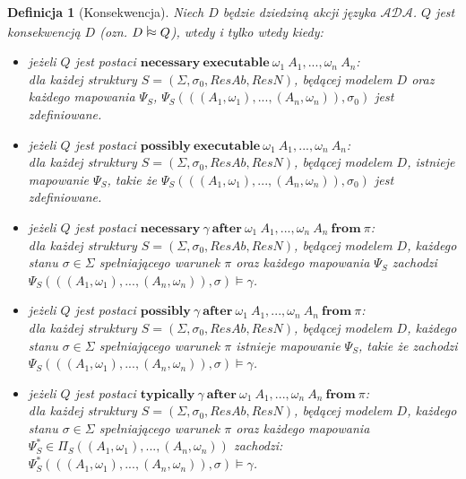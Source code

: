 \documentclass[11pt,a4paper]{article}
\newtheorem{definition}{Definicja}[section]
\newcommand{\vapprox}{\mathrel{\scalebox{1}[2]{$\shortmid$}\mkern-3.1mu\raisebox{0.1ex}{$\approx$}}}
\begin{document}
    \begin{definition}[Konsekwencja]
    	Niech $D$ będzie dziedziną akcji języka $\mathcal{ADA}$. $Q$ jest konsekwencją $D$ (ozn. $D \vapprox Q$), wtedy i tylko wtedy kiedy:
    
    \begin{itemize}
    	\item jeżeli $Q$ jest postaci $\mathbf{necessary}~\mathbf{executable}~\omega_1~A_1, ..., \omega_n~A_n$: \\ dla każdej struktury $S=(\Sigma, \sigma_0, ResAb, ResN)$, będącej modelem $D$ oraz każdego mapowania $\Psi_S$, $\Psi_S(((A_1, \omega_1), ..., (A_n, \omega_n)), \sigma_0)$ jest zdefiniowane.
    	
    	\item jeżeli $Q$ jest postaci $\mathbf{possibly}~\mathbf{executable}~\omega_1~A_1, ..., \omega_n~A_n$: \\ dla każdej struktury $S=(\Sigma, \sigma_0, ResAb, ResN)$, będącej modelem $D$, istnieje mapowanie $\Psi_S$, takie że $\Psi_S(((A_1, \omega_1), ..., (A_n, \omega_n)), \sigma_0)$ jest zdefiniowane.
    	
    	\item jeżeli $Q$ jest postaci $\mathbf{necessary}~\gamma~\mathbf{after}~\omega_1~A_1, ..., \omega_n~A_n~\mathbf{from}~\pi$: \\
    	dla każdej struktury $S=(\Sigma, \sigma_0, ResAb, ResN)$, będącej modelem $D$, każdego stanu $\sigma \in \Sigma$ spełniającego warunek $\pi$ oraz każdego mapowania $\Psi_S$ zachodzi $\Psi_S(((A_1, \omega_1), ..., (A_n, \omega_n)), \sigma) \models \gamma$.
    	
    	\item jeżeli $Q$ jest postaci $\mathbf{possibly}~\gamma~\mathbf{after}~\omega_1~A_1, ..., \omega_n~A_n~\mathbf{from}~\pi$: \\
    	dla każdej struktury $S=(\Sigma, \sigma_0, ResAb, ResN)$, będącej modelem $D$, każdego stanu $\sigma \in \Sigma$ spełniającego warunek $\pi$ istnieje mapowanie $\Psi_S$, takie że zachodzi $\Psi_S(((A_1, \omega_1), ..., (A_n, \omega_n)), \sigma) \models \gamma$.
    	
    	\item jeżeli $Q$ jest postaci $\mathbf{typically}~\gamma~\mathbf{after}~\omega_1~A_1, ..., \omega_n~A_n~\mathbf{from}~\pi$: \\
    	dla każdej struktury $S=(\Sigma, \sigma_0, ResAb, ResN)$, będącej modelem $D$, każdego stanu $\sigma \in \Sigma$ spełniającego warunek $\pi$ oraz każdego mapowania $\Psi_S^{*} \in \Pi_S((A_1, \omega_1),...,(A_n,\omega_n))$ zachodzi: \\ $\Psi_S^{*}(((A_1, \omega_1), ..., (A_n, \omega_n)), \sigma) \models \gamma$.
    	

\end{itemize}
\end{definition}
\end{document}
